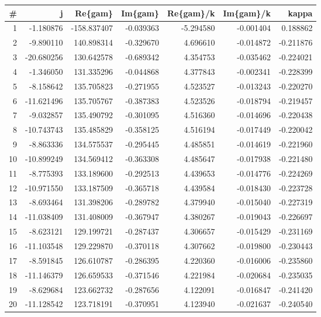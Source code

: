 \begin{tabular}{rrrrrrr}
\toprule
  \# &          j &     Re\{gam\} &   Im\{gam\} &  Re\{gam\}/k &  Im\{gam\}/k &     kappa \\
\midrule
  1 &  -1.180876 & -158.837407 & -0.039363 &  -5.294580 &  -0.001404 &  0.188862 \\
  2 &  -9.890110 &  140.898314 & -0.329670 &   4.696610 &  -0.014872 & -0.211876 \\
  3 & -20.680256 &  130.642578 & -0.689342 &   4.354753 &  -0.035462 & -0.224021 \\
  4 &  -1.346050 &  131.335296 & -0.044868 &   4.377843 &  -0.002341 & -0.228399 \\
  5 &  -8.158642 &  135.705823 & -0.271955 &   4.523527 &  -0.013243 & -0.220270 \\
  6 & -11.621496 &  135.705767 & -0.387383 &   4.523526 &  -0.018794 & -0.219457 \\
  7 &  -9.032857 &  135.490792 & -0.301095 &   4.516360 &  -0.014696 & -0.220438 \\
  8 & -10.743743 &  135.485829 & -0.358125 &   4.516194 &  -0.017449 & -0.220042 \\
  9 &  -8.863336 &  134.575537 & -0.295445 &   4.485851 &  -0.014619 & -0.221960 \\
 10 & -10.899249 &  134.569412 & -0.363308 &   4.485647 &  -0.017938 & -0.221480 \\
 11 &  -8.775393 &  133.189600 & -0.292513 &   4.439653 &  -0.014776 & -0.224269 \\
 12 & -10.971550 &  133.187509 & -0.365718 &   4.439584 &  -0.018430 & -0.223728 \\
 13 &  -8.693464 &  131.398206 & -0.289782 &   4.379940 &  -0.015040 & -0.227319 \\
 14 & -11.038409 &  131.408009 & -0.367947 &   4.380267 &  -0.019043 & -0.226697 \\
 15 &  -8.623121 &  129.199721 & -0.287437 &   4.306657 &  -0.015429 & -0.231169 \\
 16 & -11.103548 &  129.229870 & -0.370118 &   4.307662 &  -0.019800 & -0.230443 \\
 17 &  -8.591845 &  126.610787 & -0.286395 &   4.220360 &  -0.016006 & -0.235860 \\
 18 & -11.146379 &  126.659533 & -0.371546 &   4.221984 &  -0.020684 & -0.235035 \\
 19 &  -8.629684 &  123.662732 & -0.287656 &   4.122091 &  -0.016847 & -0.241420 \\
 20 & -11.128542 &  123.718191 & -0.370951 &   4.123940 &  -0.021637 & -0.240540 \\

\end{tabular}
